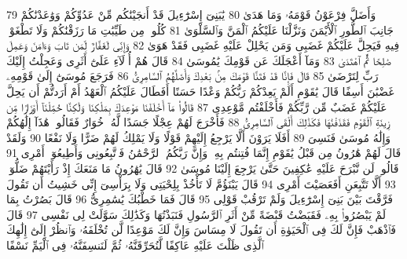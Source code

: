 {\tiny\colorbox{cl_aya}{79}} وَأَضَلَّ فِرْعَوْنُ قَوْمَهُۥ وَمَا هَدَىٰ
{\tiny\colorbox{cl_aya}{80}} يَٰبَنِىٓ إِسْرَٰٓءِيلَ قَدْ أَنجَيْنَٰكُم مِّنْ عَدُوِّكُمْ وَوَٰعَدْنَٰكُمْ جَانِبَ ٱلطُّورِ ٱلْأَيْمَنَ وَنَزَّلْنَا عَلَيْكُمُ ٱلْمَنَّ وَٱلسَّلْوَىٰ
{\tiny\colorbox{cl_aya}{81}} كُلُوا۟ مِن طَيِّبَٰتِ مَا رَزَقْنَٰكُمْ وَلَا تَطْغَوْا۟ فِيهِ فَيَحِلَّ عَلَيْكُمْ غَضَبِى وَمَن يَحْلِلْ عَلَيْهِ غَضَبِى فَقَدْ هَوَىٰ
{\tiny\colorbox{cl_aya}{82}} وَإِنِّى لَغَفَّارٌ لِّمَن تَابَ وَءَامَنَ وَعَمِلَ صَٰلِحًا ثُمَّ ٱهْتَدَىٰ
{\tiny\colorbox{cl_aya}{83}} وَمَآ أَعْجَلَكَ عَن قَوْمِكَ يَٰمُوسَىٰ
{\tiny\colorbox{cl_aya}{84}} قَالَ هُمْ أُو۟لَآءِ عَلَىٰٓ أَثَرِى وَعَجِلْتُ إِلَيْكَ رَبِّ لِتَرْضَىٰ
{\tiny\colorbox{cl_aya}{85}} قَالَ فَإِنَّا قَدْ فَتَنَّا قَوْمَكَ مِنۢ بَعْدِكَ وَأَضَلَّهُمُ ٱلسَّامِرِىُّ
{\tiny\colorbox{cl_aya}{86}} فَرَجَعَ مُوسَىٰٓ إِلَىٰ قَوْمِهِۦ غَضْبَٰنَ أَسِفًا قَالَ يَٰقَوْمِ أَلَمْ يَعِدْكُمْ رَبُّكُمْ وَعْدًا حَسَنًا أَفَطَالَ عَلَيْكُمُ ٱلْعَهْدُ أَمْ أَرَدتُّمْ أَن يَحِلَّ عَلَيْكُمْ غَضَبٌ مِّن رَّبِّكُمْ فَأَخْلَفْتُم مَّوْعِدِى
{\tiny\colorbox{cl_aya}{87}} قَالُوا۟ مَآ أَخْلَفْنَا مَوْعِدَكَ بِمَلْكِنَا وَلَٰكِنَّا حُمِّلْنَآ أَوْزَارًا مِّن زِينَةِ ٱلْقَوْمِ فَقَذَفْنَٰهَا فَكَذَٰلِكَ أَلْقَى ٱلسَّامِرِىُّ
{\tiny\colorbox{cl_aya}{88}} فَأَخْرَجَ لَهُمْ عِجْلًا جَسَدًا لَّهُۥ خُوَارٌ فَقَالُوا۟ هَٰذَآ إِلَٰهُكُمْ وَإِلَٰهُ مُوسَىٰ فَنَسِىَ
{\tiny\colorbox{cl_aya}{89}} أَفَلَا يَرَوْنَ أَلَّا يَرْجِعُ إِلَيْهِمْ قَوْلًا وَلَا يَمْلِكُ لَهُمْ ضَرًّا وَلَا نَفْعًا
{\tiny\colorbox{cl_aya}{90}} وَلَقَدْ قَالَ لَهُمْ هَٰرُونُ مِن قَبْلُ يَٰقَوْمِ إِنَّمَا فُتِنتُم بِهِۦ وَإِنَّ رَبَّكُمُ ٱلرَّحْمَٰنُ فَٱتَّبِعُونِى وَأَطِيعُوٓا۟ أَمْرِى
{\tiny\colorbox{cl_aya}{91}} قَالُوا۟ لَن نَّبْرَحَ عَلَيْهِ عَٰكِفِينَ حَتَّىٰ يَرْجِعَ إِلَيْنَا مُوسَىٰ
{\tiny\colorbox{cl_aya}{92}} قَالَ يَٰهَٰرُونُ مَا مَنَعَكَ إِذْ رَأَيْتَهُمْ ضَلُّوٓا۟
{\tiny\colorbox{cl_aya}{93}} أَلَّا تَتَّبِعَنِ أَفَعَصَيْتَ أَمْرِى
{\tiny\colorbox{cl_aya}{94}} قَالَ يَبْنَؤُمَّ لَا تَأْخُذْ بِلِحْيَتِى وَلَا بِرَأْسِىٓ إِنِّى خَشِيتُ أَن تَقُولَ فَرَّقْتَ بَيْنَ بَنِىٓ إِسْرَٰٓءِيلَ وَلَمْ تَرْقُبْ قَوْلِى
{\tiny\colorbox{cl_aya}{95}} قَالَ فَمَا خَطْبُكَ يَٰسَٰمِرِىُّ
{\tiny\colorbox{cl_aya}{96}} قَالَ بَصُرْتُ بِمَا لَمْ يَبْصُرُوا۟ بِهِۦ فَقَبَضْتُ قَبْضَةً مِّنْ أَثَرِ ٱلرَّسُولِ فَنَبَذْتُهَا وَكَذَٰلِكَ سَوَّلَتْ لِى نَفْسِى
{\tiny\colorbox{cl_aya}{97}} قَالَ فَٱذْهَبْ فَإِنَّ لَكَ فِى ٱلْحَيَوٰةِ أَن تَقُولَ لَا مِسَاسَ وَإِنَّ لَكَ مَوْعِدًا لَّن تُخْلَفَهُۥ وَٱنظُرْ إِلَىٰٓ إِلَٰهِكَ ٱلَّذِى ظَلْتَ عَلَيْهِ عَاكِفًا لَّنُحَرِّقَنَّهُۥ ثُمَّ لَنَنسِفَنَّهُۥ فِى ٱلْيَمِّ نَسْفًا
